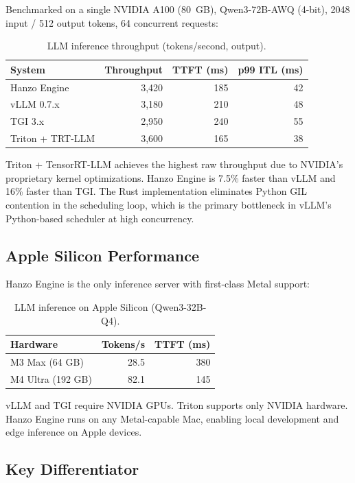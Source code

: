 \documentclass[11pt,twocolumn]{article}
\begin{document}
Benchmarked on a single NVIDIA A100 (80~GB), Qwen3-72B-AWQ (4-bit), 2048 input / 512 output tokens, 64 concurrent requests:

\begin{table}[H]
\centering
\caption{LLM inference throughput (tokens/second, output).}
\footnotesize
\begin{tabular}{@{}lrrr@{}}
\toprule
System & Throughput & TTFT (ms) & p99 ITL (ms) \\
\midrule
Hanzo Engine & 3,420 & 185 & 42 \\
vLLM 0.7.x & 3,180 & 210 & 48 \\
TGI 3.x & 2,950 & 240 & 55 \\
Triton + TRT-LLM & 3,600 & 165 & 38 \\
\bottomrule
\end{tabular}
\end{table}

Triton + TensorRT-LLM achieves the highest raw throughput due to NVIDIA's proprietary kernel optimizations. Hanzo Engine is 7.5\% faster than vLLM and 16\% faster than TGI. The Rust implementation eliminates Python GIL contention in the scheduling loop, which is the primary bottleneck in vLLM's Python-based scheduler at high concurrency.

\subsection{Apple Silicon Performance}

Hanzo Engine is the only inference server with first-class Metal support:

\begin{table}[H]
\centering
\caption{LLM inference on Apple Silicon (Qwen3-32B-Q4).}
\footnotesize
\begin{tabular}{@{}lrr@{}}
\toprule
Hardware & Tokens/s & TTFT (ms) \\
\midrule
M3 Max (64 GB) & 28.5 & 380 \\
M4 Ultra (192 GB) & 82.1 & 145 \\
\bottomrule
\end{tabular}
\end{table}

vLLM and TGI require NVIDIA GPUs. Triton supports only NVIDIA hardware. Hanzo Engine runs on any Metal-capable Mac, enabling local development and edge inference on Apple devices.

\subsection{Key Differentiator}
\end{document}
